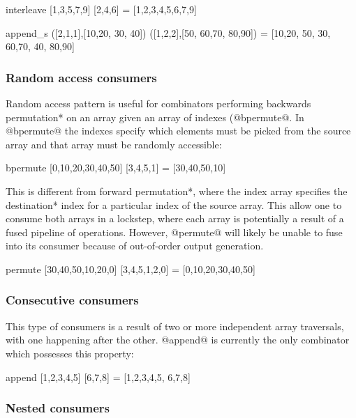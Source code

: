 \documentclass[preamble.tex]{subfiles}
\begin{document}
\begin{hscode}
interleave [1,3,5,7,9] [2,4,6] = [1,2,3,4,5,6,7,9]

append_s ([2,1,1],[10,20, 30, 40]) ([1,2,2],[50, 60,70, 80,90])
  = [10,20, 50, 30, 60,70, 40, 80,90]
\end{hscode}


\subsubsection{Random access consumers}

Random access pattern is useful for combinators performing \*backwards permutation* on an array given an array of indexes (@bpermute@. In @bpermute@ the indexes specify which elements must be picked from the source array and that array must be randomly accessible:

\begin{hscode}
bpermute [0,10,20,30,40,50] [3,4,5,1] = [30,40,50,10]
\end{hscode}

This is different from \*forward permutation*, where the index array specifies the \*destination* index for a particular index of the source array. This allow one to consume both arrays in a lockstep, where each array is potentially a result of a fused pipeline of operations. However, @permute@ will likely be unable to fuse into its consumer because of out-of-order output generation.

\begin{hscode}
permute [30,40,50,10,20,0] [3,4,5,1,2,0] = [0,10,20,30,40,50]
\end{hscode}


\subsubsection{Consecutive consumers}

This type of consumers is a result of two or more independent array traversals, with one happening after the other. @append@ is currently the only combinator which possesses this property:

\begin{hscode}
append [1,2,3,4,5] [6,7,8] = [1,2,3,4,5, 6,7,8]
\end{hscode}


\subsubsection{Nested consumers}
\end{document}
